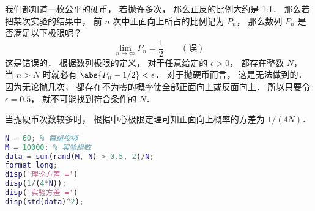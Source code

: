 
\begin{issues}
\issueDraft
\end{issues}


我们都知道一枚公平的硬币， 若抛许多次， 那么正反的比例大约是 1:1． 那么若把某次实验的结果中， 前 $n$ 次中正面向上所占的比例记为 $P_n$， 那么数列 $P_n$ 是否满足以下极限呢？
\begin{equation}
\lim_{n\to\infty} P_n = \frac{1}{2} \qquad (\text{误})
\end{equation}
这是错误的． 根据数列极限的定义， 对于任意给定的 $\epsilon > 0$， 都存在整数 $N$， 当 $n>N$ 时就必有 $\abs{P_n -1/2} < \epsilon$． 对于抛硬币而言， 这是无法做到的． 因为无论抛几次， 都存在不为零的概率使全部正面向上或反面向上． 所以只要令 $\epsilon = 0.5$， 就不可能找到符合条件的 $N$．

当抛硬币次数较多时， 根据中心极限定理可知正面向上概率的方差为 $1/(4N)$．

\begin{lstlisting}[language=matlab]
N = 60; % 每组投掷
M = 10000; % 实验组数
data = sum(rand(M, N) > 0.5, 2)/N;
format long;
disp('理论方差 =')
disp(1/(4*N));
disp('实验方差 =')
disp(std(data)^2);
\end{lstlisting}
